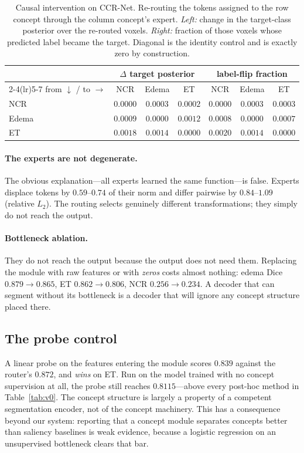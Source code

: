 \documentclass[runningheads]{llncs}
\begin{document}
\begin{table}[t]
\centering
\caption{Causal intervention on CCR-Net. Re-routing the tokens assigned to the row concept
through the column concept's expert. \emph{Left:} change in the target-class posterior over the
re-routed voxels. \emph{Right:} fraction of those voxels whose predicted label became the
target. Diagonal is the identity control and is exactly zero by construction.}
\label{tab:interv}
\begin{tabular}{lccc@{\hskip 2em}ccc}
\toprule
& \multicolumn{3}{c}{$\Delta$ target posterior} & \multicolumn{3}{c}{label-flip fraction}\\
\cmidrule(lr){2-4}\cmidrule(lr){5-7}
from $\downarrow$ / to $\rightarrow$ & NCR & Edema & ET & NCR & Edema & ET \\
\midrule
NCR    & $0.0000$ & $0.0003$ & $0.0002$ & $0.0000$ & $0.0003$ & $0.0003$ \\
Edema  & $0.0009$ & $0.0000$ & $0.0012$ & $0.0008$ & $0.0000$ & $0.0007$ \\
ET     & $0.0018$ & $0.0014$ & $0.0000$ & $0.0020$ & $0.0014$ & $0.0000$ \\
\bottomrule
\end{tabular}
\end{table}

\paragraph{The experts are not degenerate.} The obvious explanation---all experts learned the
same function---is false. Experts displace tokens by $0.59$--$0.74$ of their norm and differ
pairwise by $0.84$--$1.09$ (relative $L_2$). The routing selects genuinely different
transformations; they simply do not reach the output.

\paragraph{Bottleneck ablation.} They do not reach the output because the output does not need
them. Replacing the module with raw features or with \emph{zeros} costs almost nothing:
edema Dice $0.879\to0.865$, ET $0.862\to0.806$, NCR $0.256\to0.234$. A decoder that can
segment without its bottleneck is a decoder that will ignore any concept structure placed
there.

\subsection{The probe control}\label{sec:probe}
A linear probe on the features entering the module scores $0.839$ against the router's $0.872$,
and \emph{wins} on ET. Run on the model trained with no concept supervision at all, the probe
still reaches $0.8115$---above every post-hoc method in Table~\ref{tab:v0}. The concept
structure is largely a property of a competent segmentation encoder, not of the concept
machinery. This has a consequence beyond our system: reporting that a concept module separates
concepts better than saliency baselines is weak evidence, because a logistic regression on an
unsupervised bottleneck clears that bar.
\end{document}
